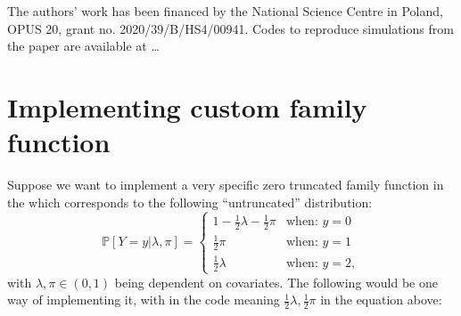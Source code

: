 \documentclass[
]{jss}
\newcommand{\1}{\mathcal{I}} \newcommand{\bx}{\boldsymbol{x}}
\begin{document}
The authors' work has been financed by the National Science Centre in
Poland, OPUS 20, grant no. 2020/39/B/HS4/00941. Codes to reproduce
simulations from the paper are available at \ldots{}

\appendix

\section[Implementing custom singleRcapture family function]{Implementing
custom  family
function}\label{implementing-custom-family-function}

Suppose we want to implement a very specific zero truncated family
function in the  which corresponds to the following
``untruncated'' distribution: \begin{equation}
  \mathbb{P}[Y=y|\lambda, \pi] = \begin{cases}
    1 - \frac{1}{2}\lambda - \frac{1}{2}\pi & \text{when: } y=0\\
    \frac{1}{2}\pi & \text{when: } y=1\\
    \frac{1}{2}\lambda & \text{when: } y=2,
  \end{cases}
\end{equation} with \(\lambda, \pi\in\left(0, 1\right)\) being dependent
on covariates. The following would be one way of implementing it, with
 in the code meaning
\(\frac{1}{2}\lambda,\frac{1}{2}\pi\) in the equation above:

\footnotesize
\end{document}
